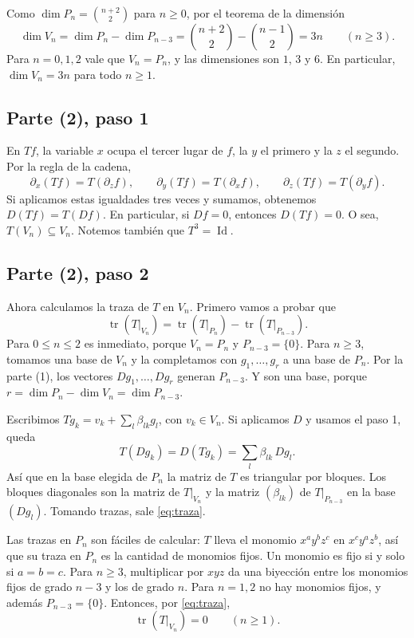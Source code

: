 \documentclass[11pt]{amsproc}
\newcommand{\tr}{\operatorname{tr}}
\newcommand{\Id}{\operatorname{Id}}
\begin{document}
Como $\dim P_n=\binom{n+2}{2}$ para $n\ge 0$, por el teorema de la dimensión
\[
  \dim V_n=\dim P_n-\dim P_{n-3}
          =\binom{n+2}{2}-\binom{n-1}{2}=3n\qquad (n\ge 3).
\]
Para $n=0,1,2$ vale que $V_n=P_n$, y las dimensiones son $1$, $3$ y $6$. En
particular, $\dim V_n=3n$ para todo $n\ge 1$.

\subsection*{Parte (2), paso 1}

En $Tf$, la variable $x$ ocupa el tercer lugar de $f$, la $y$ el primero y la
$z$ el segundo. Por la regla de la cadena,
\[
  \partial_x(Tf)=T(\partial_z f),\qquad
  \partial_y(Tf)=T(\partial_x f),\qquad
  \partial_z(Tf)=T(\partial_y f).
\]
Si aplicamos estas igualdades tres veces y sumamos, obtenemos
$D(Tf)=T(Df)$. En particular, si $Df=0$, entonces $D(Tf)=0$. O sea,
$T(V_n)\subseteq V_n$. Notemos también que $T^3=\Id$.

\subsection*{Parte (2), paso 2}

Ahora calculamos la traza de $T$ en $V_n$. Primero vamos a probar que
\begin{equation}\label{eq:traza}
  \tr(T|_{V_n})=\tr(T|_{P_n})-\tr(T|_{P_{n-3}}).
\end{equation}
Para $0\le n\le 2$ es inmediato, porque $V_n=P_n$ y $P_{n-3}=\{0\}$. Para
$n\ge 3$, tomamos una base de $V_n$ y la completamos con $g_1,\dots,g_r$ a
una base de $P_n$. Por la parte (1), los vectores $Dg_1,\dots,Dg_r$ generan
$P_{n-3}$. Y son una base, porque $r=\dim P_n-\dim V_n=\dim P_{n-3}$.

Escribimos $Tg_k=v_k+\sum_l\beta_{lk}g_l$, con $v_k\in V_n$. Si aplicamos $D$
y usamos el paso 1, queda
\[
  T(Dg_k)=D(Tg_k)=\sum_l\beta_{lk}\,Dg_l.
\]
Así que en la base elegida de $P_n$ la matriz de $T$ es triangular por
bloques. Los bloques diagonales son la matriz de $T|_{V_n}$ y la matriz
$(\beta_{lk})$ de $T|_{P_{n-3}}$ en la base $(Dg_l)$. Tomando trazas, sale
\eqref{eq:traza}.

Las trazas en $P_n$ son fáciles de calcular: $T$ lleva el monomio
$x^ay^bz^c$ en $x^cy^az^b$, así que su traza en $P_n$ es la cantidad de
monomios fijos. Un monomio es fijo si y solo si $a=b=c$. Para $n\ge 3$,
multiplicar por $xyz$ da una biyección entre los monomios fijos de grado
$n-3$ y los de grado $n$. Para $n=1,2$ no hay monomios fijos, y además
$P_{n-3}=\{0\}$. Entonces, por \eqref{eq:traza},
\[
  \tr(T|_{V_n})=0\qquad(n\ge 1).
\]
\end{document}
